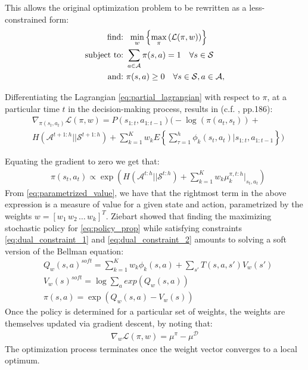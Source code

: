 \documentclass[letterpaper]{article}
\begin{document}
This allows the original optimization problem to be rewritten as a less-constrained form:
\begin{align}
\hbox{find:}\,\,&\,\,\min_{w}\left\{\max_\pi\left(\mathcal{L}(\pi,w)\right)\right\}\label{eq:partial_dual_obj}\\
\hbox{subject to:}\,\,&\sum_{a\in\mathcal{A}}\pi(s,a)  = 1\quad\forall s\in\mathcal{S}\label{eq:dual_constraint_1}\\
\hbox{and:}\,\,&\pi(s,a) \geq 0\quad\forall s\in\mathcal{S},a\in\mathcal{A},\label{eq:dual_constraint_2}
\end{align}

Differentiating the Lagrangian \eqref{eq:partial_lagrangian} with respect to $\pi$, at a particular time $t$ in the decision-making process, results in (c.f. \cite{ziebart2010modelingthesis}
, pp.186):
\begin{equation}
 \begin{split}
 &\nabla_{\pi(s_t,a_t)}\mathcal{L}(\pi,w) = P(s_{1:t},a_{1:t-1})\Bigg(-\log(\pi(a_t,s_t))+ \\
& H(\mathcal{A}^{t+1:h}||\mathcal{S}^{t+1:h})
 +\sum_{k=1}^K w_kE\left\{\sum_{\tau=1}^h \phi_k(s_t,a_t)|s_{1:t},a_{1:t-1}\right\}\Bigg) \label{eqn:zieb_lagragian_derivative}
 \end{split}
\end{equation}

Equating the gradient to zero we get that:
\begin{equation}
\label{eq:policy_prop}
	\begin{split}
	&\pi(s_t,a_t) \propto \exp\left(H(\mathcal{A}^{t:h}||\mathcal{S}^{t:h})+\sum^K_{k=1} w_k\mu_k^{\pi,t:h}|_{s_t,a_t}\right)
	\end{split}
\end{equation}
From \eqref{eq:parametrized_value}, we have that the rightmost term in the above expression is a measure of value for a given state and action, parametrized by the weights $w=[w_1\,w_2\,\ldots\,w_k]^T$. Ziebart showed that finding the maximizing stochastic policy for \eqref{eq:policy_prop} while satisfying constraints \eqref{eq:dual_constraint_1} and \eqref{eq:dual_constraint_2} amounts to solving a soft version of the Bellman equation:
	\begin{equation}
		\begin{split}
	&Q_w(s,a)^{soft} = \sum_{k=1}^Kw_k\phi_k(s,a) + \sum_{s'}T(s,a,s')V_w(s')\\	
	&V_w(s)^{soft} = \log\sum_{a}exp(Q_w(s,a))\\
	&\pi(s,a) = \exp(Q_w(s,a) - V_w(s))
	\end{split}
	\end{equation}
Once the policy is determined for a particular set of weights, the weights are themselves updated via gradient descent, by noting that:
 \begin{align}
   \label{eq:weight_update}
   \nabla_{w}\mathcal{L}(\pi,w) =\mu^\pi - \mu^{\mathcal{D}}
 \end{align}
The optimization process terminates once the weight vector converges to a local optimum.
\end{document}
